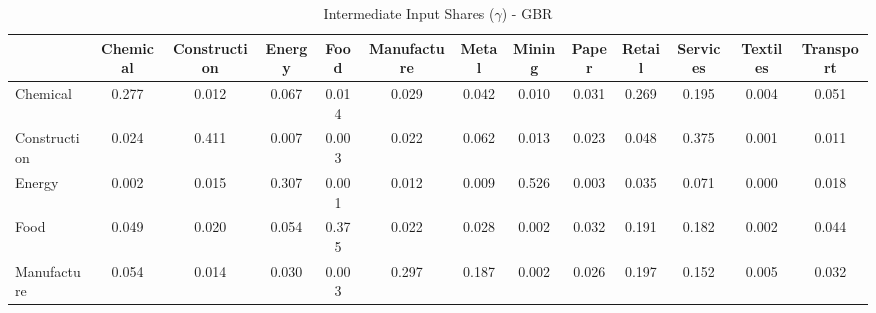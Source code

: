 \begin{table}[htbp]
\centering
\caption{Intermediate Input Shares ($\gamma$) - GBR} 
\label{tab:gamma_GBR}
\begin{tabular}{lcccccccccccc}
  \hline
 & Chemical & Construction & Energy & Food & Manufacture & Metal & Mining & Paper & Retail & Services & Textiles & Transport \\ 
  \hline
Chemical & \textcolor[RGB]{27,17,228}{0.277} & \textcolor[RGB]{188,121,67}{0.012} & \textcolor[RGB]{73,47,182}{0.067} & \textcolor[RGB]{181,117,74}{0.014} & \textcolor[RGB]{135,87,120}{0.029} & \textcolor[RGB]{110,71,145}{0.042} & \textcolor[RGB]{198,128,57}{0.010} & \textcolor[RGB]{131,85,124}{0.031} & \textcolor[RGB]{28,18,227}{0.269} & \textcolor[RGB]{39,25,216}{0.195} & \textcolor[RGB]{216,140,39}{0.004} & \textcolor[RGB]{90,58,165}{0.051} \\ 
  Construction & \textcolor[RGB]{151,97,104}{0.024} & \textcolor[RGB]{4,2,251}{0.411} & \textcolor[RGB]{202,131,53}{0.007} & \textcolor[RGB]{223,144,32}{0.003} & \textcolor[RGB]{156,101,99}{0.022} & \textcolor[RGB]{80,52,175}{0.062} & \textcolor[RGB]{184,119,71}{0.013} & \textcolor[RGB]{152,99,103}{0.023} & \textcolor[RGB]{96,62,159}{0.048} & \textcolor[RGB]{9,6,246}{0.375} & \textcolor[RGB]{250,162,5}{0.001} & \textcolor[RGB]{195,126,60}{0.011} \\ 
  Energy & \textcolor[RGB]{225,146,30}{0.002} & \textcolor[RGB]{175,113,80}{0.015} & \textcolor[RGB]{18,11,237}{0.307} & \textcolor[RGB]{243,157,12}{0.001} & \textcolor[RGB]{186,120,69}{0.012} & \textcolor[RGB]{200,129,55}{0.009} & \textcolor[RGB]{2,1,253}{0.526} & \textcolor[RGB]{221,143,34}{0.003} & \textcolor[RGB]{120,78,135}{0.035} & \textcolor[RGB]{64,41,191}{0.071} & \textcolor[RGB]{253,164,2}{0.000} & \textcolor[RGB]{163,105,92}{0.018} \\ 
  Food & \textcolor[RGB]{94,61,161}{0.049} & \textcolor[RGB]{161,104,94}{0.020} & \textcolor[RGB]{87,56,168}{0.054} & \textcolor[RGB]{11,7,244}{0.375} & \textcolor[RGB]{154,100,101}{0.022} & \textcolor[RGB]{140,91,115}{0.028} & \textcolor[RGB]{239,155,16}{0.002} & \textcolor[RGB]{124,80,131}{0.032} & \textcolor[RGB]{41,26,214}{0.191} & \textcolor[RGB]{46,30,209}{0.182} & \textcolor[RGB]{236,152,19}{0.002} & \textcolor[RGB]{106,69,149}{0.044} \\ 
  Manufacture & \textcolor[RGB]{85,55,170}{0.054} & \textcolor[RGB]{179,116,76}{0.014} & \textcolor[RGB]{133,86,122}{0.030} & \textcolor[RGB]{218,141,37}{0.003} & \textcolor[RGB]{21,14,234}{0.297} & \textcolor[RGB]{42,27,212}{0.187} & \textcolor[RGB]{232,150,23}{0.002} & \textcolor[RGB]{142,92,113}{0.026} & \textcolor[RGB]{37,24,218}{0.197} & \textcolor[RGB]{51,33,204}{0.152} & \textcolor[RGB]{209,135,46}{0.005} & \textcolor[RGB]{128,82,128}{0.032} \\ 

\end{tabular}
\end{table}
